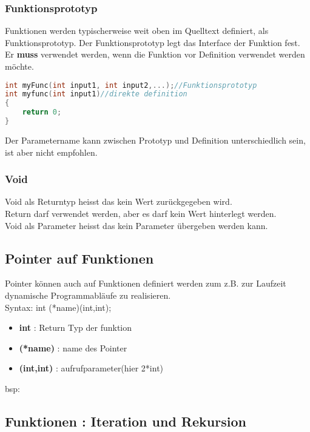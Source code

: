 \subsubsection{Funktionsprototyp}

Funktionen werden typischerweise weit oben im Quelltext definiert, als Funktionsprototyp. 
Der Funktionsprototyp legt das Interface der Funktion fest. 
Er \textbf{muss} verwendet werden, wenn die Funktion vor Definition verwendet werden möchte.

\begin{lstlisting}[language = c]
int myFunc(int input1, int input2,...);//Funktionsprototyp
int myfunc(int input1)//direkte definition
{
    return 0;
}
\end{lstlisting}
Der Parametername kann zwischen Prototyp und Definition unterschiedlich sein, ist aber nicht empfohlen.

\subsubsection{Void}

Void als Returntyp heisst das kein Wert zurückgegeben wird.\\
Return darf verwendet werden, aber es darf kein Wert hinterlegt werden.\\
Void als Parameter heisst das kein Parameter übergeben werden kann.

\nextcol

\subsection{Pointer auf Funktionen}

Pointer können auch auf Funktionen definiert werden zum z.B. zur Laufzeit dynamische Programmabläufe zu realisieren.\\
Syntax: int (*name)(int,int);

\begin{itemize}[itemsep=1pt, parsep=0pt]
    \item \textbf{int} : Return Typ der funktion
    \item \textbf{(*name)} : name des Pointer
    \item \textbf{(int,int)} : aufrufparameter(hier 2*int)

\end{itemize}

bsp:



\subsection{Funktionen : Iteration und Rekursion}

